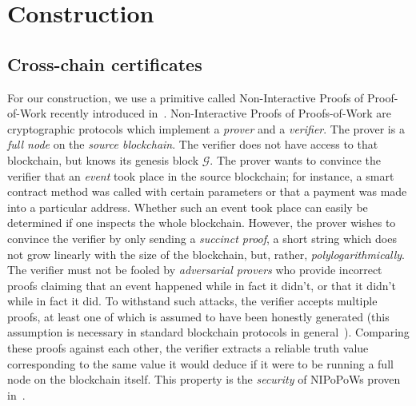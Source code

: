 \section{Construction}
\subsection*{Cross-chain certificates}
For our construction, we use a primitive called Non-Interactive Proofs of
Proof-of-Work recently introduced in~\cite{nipopows}.
Non-Interactive Proofs of Proofs-of-Work are cryptographic protocols which
implement a \emph{prover} and a \emph{verifier}. The prover is a \emph{full
node} on the \emph{source blockchain}. The verifier does not have access to
that blockchain, but knows its genesis block $\mathcal{G}$. The prover wants to
convince the verifier that an \emph{event} took place in the source blockchain;
for instance, a smart contract method was called with certain parameters or that
a payment was made into a particular address. Whether such an event took place
can easily be determined if one inspects the whole blockchain. However, the
prover wishes to convince the verifier by only sending a \emph{succinct proof},
a short string which does not grow linearly  with the size of the blockchain,
but, rather, \emph{polylogarithmically}. The verifier must not be fooled by
\emph{adversarial provers} who provide incorrect proofs claiming that an event
happened while in fact it didn't, or that it didn't while in fact it did. To
withstand such attacks, the verifier accepts multiple proofs, at least one of
which is assumed to have been honestly generated (this assumption is necessary
in standard blockchain protocols in
general~\cite{EPRINT:KKZG15,wust2016ethereum}). Comparing these proofs against
each other, the verifier extracts a reliable truth value corresponding to the
same value it would deduce if it were to be running a full node on the
blockchain itself. This property is the \emph{security} of NIPoPoWs proven
in~\cite{nipopows}.

